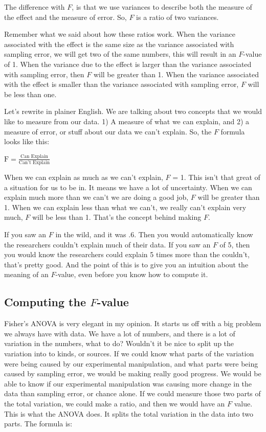 \documentclass[
]{book}
\begin{document}
The difference with \(F\), is that we use variances to describe both the measure of the effect and the measure of error. So, \(F\) is a ratio of two variances.

Remember what we said about how these ratios work. When the variance associated with the effect is the same size as the variance associated with sampling error, we will get two of the same numbers, this will result in an \(F\)-value of 1. When the variance due to the effect is larger than the variance associated with sampling error, then \(F\) will be greater than 1. When the variance associated with the effect is smaller than the variance associated with sampling error, \(F\) will be less than one.

Let's rewrite in plainer English. We are talking about two concepts that we would like to measure from our data. 1) A measure of what we can explain, and 2) a measure of error, or stuff about our data we can't explain. So, the \(F\) formula looks like this:

\(\text{F} = \frac{\text{Can Explain}}{\text{Can't Explain}}\)

When we can explain as much as we can't explain, \(F\) = 1. This isn't that great of a situation for us to be in. It means we have a lot of uncertainty. When we can explain much more than we can't we are doing a good job, \(F\) will be greater than 1. When we can explain less than what we can't, we really can't explain very much, \(F\) will be less than 1. That's the concept behind making \(F\).

If you saw an \(F\) in the wild, and it was .6. Then you would automatically know the researchers couldn't explain much of their data. If you saw an \(F\) of 5, then you would know the researchers could explain 5 times more than the couldn't, that's pretty good. And the point of this is to give you an intuition about the meaning of an \(F\)-value, even before you know how to compute it.

\hypertarget{computing-the-f-value}{%
\subsection{\texorpdfstring{Computing the \(F\)-value}{Computing the F-value}}\label{computing-the-f-value}}

Fisher's ANOVA is very elegant in my opinion. It starts us off with a big problem we always have with data. We have a lot of numbers, and there is a lot of variation in the numbers, what to do? Wouldn't it be nice to split up the variation into to kinds, or sources. If we could know what parts of the variation were being caused by our experimental manipulation, and what parts were being caused by sampling error, we would be making really good progress. We would be able to know if our experimental manipulation was causing more change in the data than sampling error, or chance alone. If we could measure those two parts of the total variation, we could make a ratio, and then we would have an \(F\) value. This is what the ANOVA does. It splits the total variation in the data into two parts. The formula is:
\end{document}
